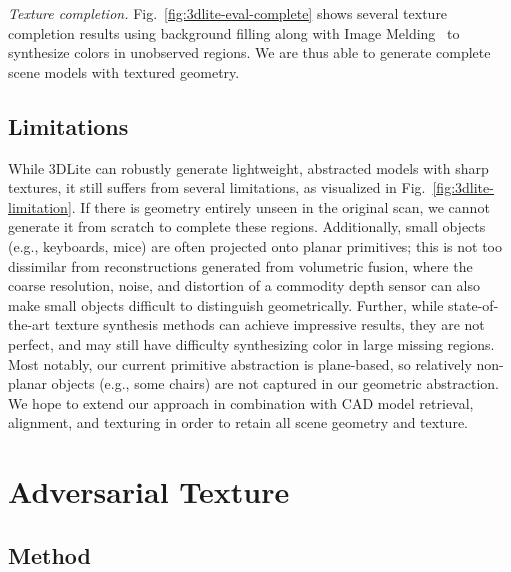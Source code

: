 \emph{Texture completion.}
Fig.~\ref{fig:3dlite-eval-complete} shows several texture completion results using background filling along with Image Melding~\cite{darabi2012image} to synthesize colors in unobserved regions.
We are thus able to generate complete scene models with textured geometry.

\subsection{Limitations}
\label{subsec:3dlite-limitations}

While 3DLite can robustly generate lightweight, abstracted models with sharp textures, it still suffers from several limitations, as visualized in Fig.~\ref{fig:3dlite-limitation}.
If there is geometry entirely unseen in the original scan, we cannot generate it from scratch to complete these regions. 
Additionally, small objects (e.g., keyboards, mice) are often projected onto planar primitives; this is not too dissimilar from reconstructions generated from volumetric fusion, where the coarse resolution, noise, and distortion of a commodity depth sensor can also make small objects difficult to distinguish geometrically.
Further, while state-of-the-art texture synthesis methods can achieve impressive results, they are not perfect, and may still have difficulty synthesizing color in large missing regions.
Most notably, our current primitive abstraction is plane-based, so relatively non-planar objects (e.g., some chairs) are not captured in our geometric abstraction. We hope to extend our approach in combination with CAD model retrieval, alignment, and texturing in order to retain all scene geometry and texture.

\section{Adversarial Texture}
\label{sec:tadv}
\subsection{Method}


